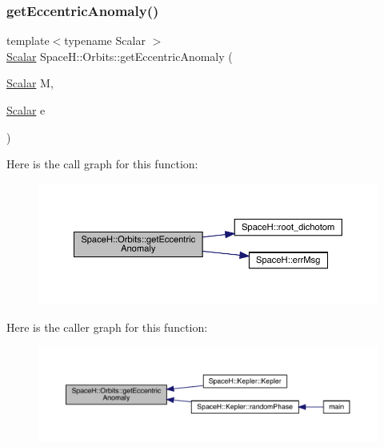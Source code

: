 \mbox{\label{namespace_space_h_1_1_orbits_a729783768420346b170d79aa5e196841}} 
\subsubsection{\texorpdfstring{get\+Eccentric\+Anomaly()}{calcuEccentricAnomaly()}}
{\footnotesize\ttfamily template$<$typename Scalar $>$ \\
\mbox{\hyperlink{create_kepler_8cpp_a8c2981f3f834be9448a6ab06c28748eb}{Scalar}} Space\+H\+::\+Orbits\+::get\+Eccentric\+Anomaly (\begin{DoxyParamCaption}\item[{\mbox{\hyperlink{create_kepler_8cpp_a8c2981f3f834be9448a6ab06c28748eb}{Scalar}}}]{M,  }\item[{\mbox{\hyperlink{create_kepler_8cpp_a8c2981f3f834be9448a6ab06c28748eb}{Scalar}}}]{e }\end{DoxyParamCaption})}

Here is the call graph for this function\+:
\nopagebreak
\begin{figure}[H]
\begin{center}
\leavevmode
\includegraphics[width=350pt]{namespace_space_h_1_1_orbits_a729783768420346b170d79aa5e196841_cgraph}
\end{center}
\end{figure}
Here is the caller graph for this function\+:
\nopagebreak
\begin{figure}[H]
\begin{center}
\leavevmode
\includegraphics[width=350pt]{namespace_space_h_1_1_orbits_a729783768420346b170d79aa5e196841_icgraph}
\end{center}
\end{figure}
\mbox{\label{namespace_space_h_1_1_orbits_ab0a6bf4bbce5725fa15cc6250057817c}} 
